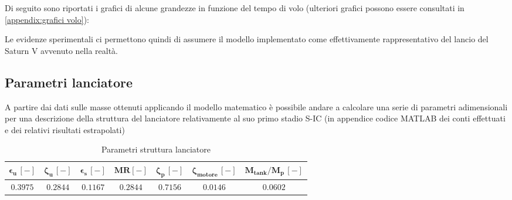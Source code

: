 Di seguito sono riportati i grafici di alcune grandezze in funzione del tempo di volo (ulteriori grafici possono essere consultati in \autoref{appendix:grafici volo}):



Le evidenze sperimentali ci permettono quindi di assumere il modello implementato come effettivamente rappresentativo del lancio del Saturn V avvenuto nella realtà.

\subsection{Parametri lanciatore}
\label{subsec:parametri primo stadio}
A partire dai dati sulle masse ottenuti applicando il modello matematico è possibile andare a calcolare una serie di parametri adimensionali per una descrizione della struttura del lanciatore relativamente al suo primo stadio S-IC (in appendice codice MATLAB dei conti effettuati e dei relativi risultati estrapolati)

\begin{table}[H]
\centering
\begin{tabular}{|c|c|c|c|c|c|c|}
\hline
$\bm{\epsilon_u \, [-]}$ & $\bm{\zeta_u \, [-]}$ & $\bm{\epsilon_s \, [-]}$ & $\bm{MR [-]}$ & $\bm{\zeta_p \, [-]}$ & $\bm{\zeta_{motore} \, [-]}$ & $\bm{M_{tank}/M_p \, [-]}$  \\
\hline
$0.3975$ & $0.2844$ & $0.1167$ &  $0.2844$ & $0.7156$ & $0.0146$ & $0.0602$  \\
\hline
\end{tabular}

\caption{Parametri struttura lanciatore}
\label{table: structural performance data}
\end{table}
